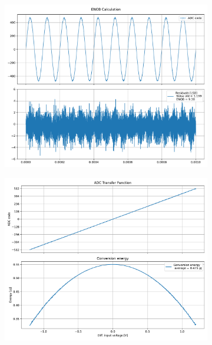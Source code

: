 \documentclass[varwidth]{standalone}
\begin{document}
\begin{figure}
\begin{subfigure}{0.32\textwidth}
    \includegraphics[width=\textwidth]{behavioral_10b_noisy_radix175_enob.pdf}
\end{subfigure}
\begin{subfigure}{0.32\textwidth}
    \begin{table}
    \let\center\empty
    \let\endcenter\relax
    \centering
    \resizebox{0.3\width}{!}{}
    \end{table}
    \includegraphics[width=\textwidth]{behavioral_10b_noisy_radix175_energy.pdf}
\end{subfigure}
\end{figure}
\end{document}

